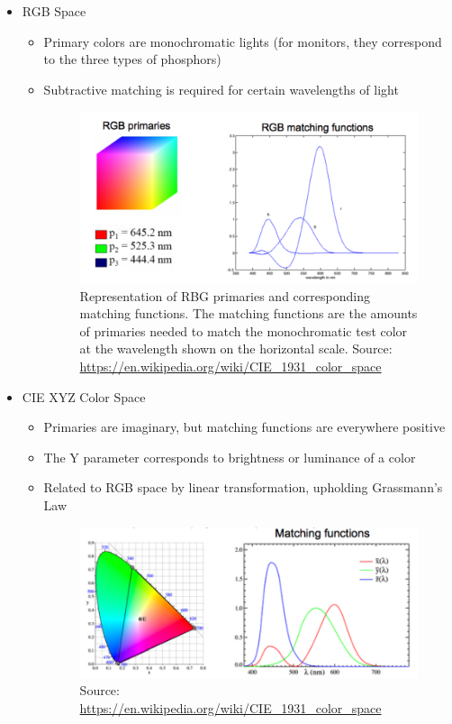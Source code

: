 \documentclass{article}
\begin{document}
    \begin{itemize}
    \item RGB Space
     \begin{itemize}
     \item Primary colors are monochromatic lights (for monitors, they correspond to the three types of phosphors)
     \item Subtractive matching is required for certain wavelengths of light

	  \begin{figure}[h!]
      \centering
      \includegraphics[width=10cm]{rgb1.png}
      \caption{Representation of RBG primaries and corresponding matching functions. The matching functions are the amounts of primaries needed to match the monochromatic test color at the wavelength shown on the horizontal scale. Source: \url{https://en.wikipedia.org/wiki/CIE_1931_color_space}}
      \end{figure}
     
     \end{itemize}
   
    \item CIE XYZ Color Space
     \begin{itemize}
     \item Primaries are imaginary, but matching functions are everywhere positive 
     \item The Y parameter corresponds to brightness or luminance of a color
     \item Related to RGB space by linear transformation, upholding Grassmann's Law
     
	  \begin{figure}[h!]
      \centering
      \includegraphics[width=10cm]{xyz1.png}
      \caption{Source: \url{https://en.wikipedia.org/wiki/CIE_1931_color_space}}
      \end{figure}
     
     \end{itemize}
    \end{itemize}
\end{document}
